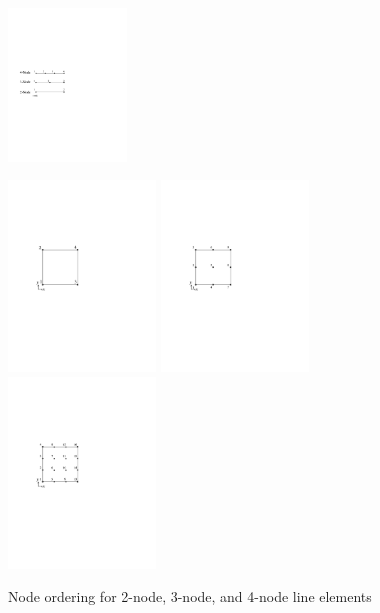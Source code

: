 \clearpage
\begin{figure}[htbp]
\centering
\includegraphics[trim=0.5in 4.5in 4.0in 4.0in, clip, height=1.6in]{fig/nodeordering1D.pdf}
\caption{Node ordering for 2-node, 3-node, and 4-node line elements}
\label{fig:NodeOrderingLine}
\begin{minipage}{\linewidth}
\includegraphics[trim=1.5in 4.5in 4.2in 3.5in, clip, height=2in]{fig/nodeordering2D_4.pdf}
\hfill
\includegraphics[trim=1.5in 4.5in 4.2in 3.5in, clip, height=2in]{fig/nodeordering2D_9.pdf}
\hfill
\includegraphics[trim=1.5in 4.5in 4.2in 3.5in, clip, height=2in]{fig/nodeordering2D_16.pdf}

\end{minipage}
\end{figure}
